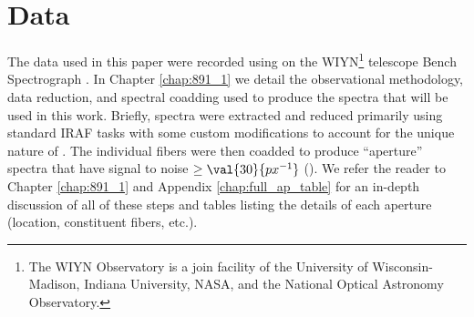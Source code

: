 \section{Data}
\label{891_2:sec:data}
The data used in this paper were recorded using \GP \citep{Wood12} on
the WIYN\footnote{The WIYN Observatory is a join facility of the
  University of Wisconsin-Madison, Indiana University, NASA, and the
  National Optical Astronomy Observatory.} telescope Bench
Spectrograph \citep{Barden94,Bershady08,Knezek10}. In Chapter
\ref{chap:891_1} we detail the observational methodology, data
reduction, and spectral coadding used to produce the spectra that will
be used in this work. Briefly, spectra were extracted and reduced
primarily using standard IRAF tasks with some custom modifications to
account for the unique nature of \GP. The individual fibers were then
coadded to produce ``aperture'' spectra that have signal to noise
$\geq \val{30}{px^{-1}}$ (). We refer the
reader to Chapter \ref{chap:891_1} and Appendix
\ref{chap:full_ap_table} for an in-depth discussion of all of these
steps and tables listing the details of each aperture (location,
constituent fibers, etc.).
